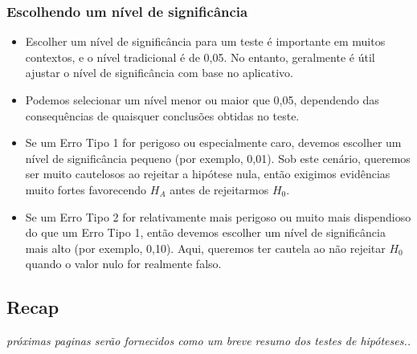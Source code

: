 \documentclass[11pt]{beamer}
\begin{document}
\begin{frame}
\frametitle{Escolhendo um nível de significância}

\begin{itemize}

\item Escolher um nível de significância para um teste é importante em muitos contextos, e o nível tradicional é de 0,05. No entanto, geralmente é útil ajustar o nível de significância com base no aplicativo. 

\item Podemos selecionar um nível menor ou maior que 0,05, dependendo das consequências de quaisquer conclusões obtidas no teste.

\item Se um Erro Tipo 1 for perigoso ou especialmente caro, devemos escolher um nível de significância pequeno (por exemplo, 0,01). Sob este cenário, queremos ser muito cautelosos ao rejeitar a hipótese nula, então exigimos evidências muito fortes favorecendo $ H_A $ antes de rejeitarmos $ H_0 $.

\item Se um Erro Tipo 2 for relativamente mais perigoso ou muito mais dispendioso do que um Erro Tipo 1, então devemos escolher um nível de significância mais alto (por exemplo, 0,10). Aqui, queremos ter cautela ao não rejeitar $ H_0 $ quando o valor nulo for realmente falso.

\end{itemize}

\end{frame}


\subsection{Recap}


\begin{frame}

\vfill

\textit{próximas paginas serão fornecidos como um breve resumo dos testes de hipóteses..}

\vfill

\end{frame}

\end{document}

